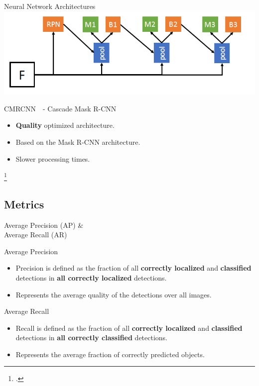 \documentclass[18pt]{beamer}
\begin{document}
\begin{frame}{Neural Network Architectures}
\centering
\includegraphics[height=0.45\textheight]{figures/cascade_mask_r-cnn_architecture.png}
\begin{block}{CMRCNN~\footnotemark~- Cascade Mask R-CNN}
	\begin{itemize}
		\item \textbf{Quality} optimized architecture.
		\item Based on  the Mask R-CNN architecture.
		\item Slower processing times.
	\end{itemize}
\end{block}
\footcitetext{DBLP:journals/corr/abs-1712-00726}
\end{frame}



\subsection{Metrics}

\begin{frame}{Average Precision (AP) \& \\ Average Recall (AR)}
	\begin{block}{Average Precision}
		\begin{itemize}
			\item Precision is defined as the fraction of all \textbf{correctly localized} and \textbf{classified} detections in \textbf{all correctly localized} detections.
			\item Represents the average quality of the detections over all images.
		\end{itemize}
	\end{block}
	\begin{block}{Average Recall}
		\begin{itemize}
			\item Recall is defined as the fraction of all \textbf{correctly localized} and \textbf{classified} detections in \textbf{all correctly classified} detections.
			\item Represents the average fraction of correctly predicted objects.
		\end{itemize}
	\end{block}
\end{frame}
\end{document}
